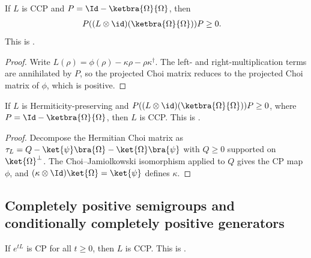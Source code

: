 \begin{theorem}
    \label{thm:ccp_implies_choi_projected}
    \leanok
    If $L$ is CCP and $P = \Id - \ketbra{\Omega}{\Omega}$, then
    \begin{align}
        P((L\otimes\id)(\ketbra{\Omega}{\Omega}))P
        &\ge 0.
        \label{eq:semigroup_choi_projected}
    \end{align}
    This is \cite[Proposition~7.2]{Wolf2012Quantum}.
\end{theorem}

\begin{proof}
    \leanok
    Write $L(\rho) = \phi(\rho)-\kappa\rho-\rho\kappa^\dagger$.
    The left- and right-multiplication terms are annihilated by $P$, so the
    projected Choi matrix reduces to the projected Choi matrix of $\phi$, which
    is positive.
\end{proof}

\begin{theorem}
    \label{thm:choi_projected_implies_ccp}
    \leanok
    If $L$ is Hermiticity-preserving and
    $P((L\otimes\id)(\ketbra{\Omega}{\Omega}))P \ge 0$,
    where $P = \Id - \ketbra{\Omega}{\Omega}$,
    then $L$ is CCP.
    This is \cite[Proposition~7.2]{Wolf2012Quantum}.
\end{theorem}

\begin{proof}
    \leanok
    Decompose the Hermitian Choi matrix as
    $\tau_L = Q-\ket{\psi}\bra{\Omega}-\ket{\Omega}\bra{\psi}$
    with $Q \ge 0$ supported on $\ket{\Omega}^\perp$.
    The Choi--Jamiolkowski isomorphism applied to $Q$ gives
    the CP map $\phi$, and
    $(\kappa\otimes\Id)\ket{\Omega} = \ket{\psi}$ defines $\kappa$.
\end{proof}

\subsection{Completely positive semigroups and conditionally completely positive generators}

\begin{theorem}
    \label{thm:cp_semigroup_implies_ccp}
    \leanok
    If $e^{tL}$ is CP for all $t \ge 0$, then $L$ is CCP.
    This is \cite[Proposition~7.3]{Wolf2012Quantum}.
\end{theorem}

